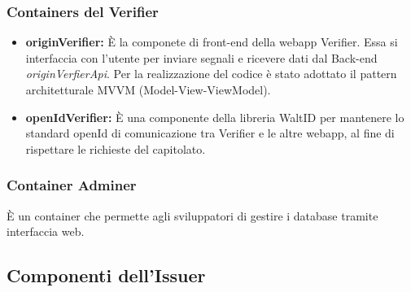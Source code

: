 \subsubsection{Containers del \textbf{Verifier}}
\begin{itemize}
    \item \textbf{originVerifier:} È la componete di front-end della webapp Verifier. Essa si interfaccia con l'utente per inviare segnali e ricevere dati dal Back-end \textit{originVerfierApi}. Per la realizzazione del codice è stato adottato il pattern architetturale MVVM (Model-View-ViewModel).
    \item \textbf{openIdVerifier:} È una componente della libreria WaltID per mantenere lo standard openId di comunicazione tra Verifier e le altre webapp, al fine di rispettare le richieste del capitolato.
\end{itemize}
\subsubsection{Container \textbf{Adminer}}
È un container che permette agli sviluppatori di gestire i database tramite interfaccia web.

\clearpage

\subsection{Componenti dell'\textbf{Issuer}}

